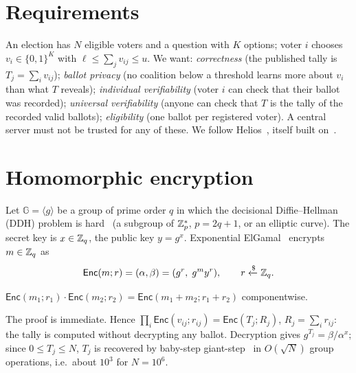 \documentclass[10pt,twocolumn]{article}
\newcommand{\G}{\mathbb{G}}
\newcommand{\Enc}{\mathsf{Enc}}
\begin{document}
\maketitle

\begin{abstract}
\noindent In the 2022 French legislative elections, more than $77\%$ of voters abroad voted online, but could not verify that their ballot was counted. We describe a Helios-type protocol in which (i) ballots are encrypted with additively homomorphic exponential ElGamal, so that the tally is computed on ciphertexts; (ii) each ballot carries non-interactive zero-knowledge proofs of validity; (iii) the decryption key is shared among trustees; (iv) every voter can check that their ballot is on a public bulletin board, and anyone can recompute the result. We state the security reductions, the soundness and zero-knowledge of the proofs, and a cost analysis showing that elections with $10^6$ voters are verifiable on commodity hardware, with none of the energy cost of a public blockchain.
\end{abstract}

\section{Requirements}
An election has $N$ eligible voters and a question with $K$ options; voter $i$ chooses $v_i\in\{0,1\}^K$ with $\ell\le\sum_jv_{ij}\le u$. We want: \emph{correctness} (the published tally is $T_j=\sum_iv_{ij}$); \emph{ballot privacy} (no coalition below a threshold learns more about $v_i$ than what $T$ reveals); \emph{individual verifiability} (voter $i$ can check that their ballot was recorded); \emph{universal verifiability} (anyone can check that $T$ is the tally of the recorded valid ballots); \emph{eligibility} (one ballot per registered voter). A central server must not be trusted for any of these. We follow Helios~\cite{helios2008}, itself built on~\cite{cgs1997}.

\section{Homomorphic encryption}
Let $\G=\langle g\rangle$ be a group of prime order $q$ in which the decisional Diffie--Hellman (DDH) problem is hard~\cite{boneh1998} (a subgroup of $\mathbb{Z}_p^*$, $p=2q+1$, or an elliptic curve). The secret key is $x\in\mathbb{Z}_q$, the public key $y=g^x$. Exponential ElGamal~\cite{elgamal1985} encrypts $m\in\mathbb{Z}_q$ as
\begin{equation}
\Enc(m;r)=(\alpha,\beta)=(g^r,\;g^my^r),\qquad r\xleftarrow{\$}\Z_q .
\end{equation}
\begin{proposition}[homomorphism]
$\Enc(m_1;r_1)\cdot\Enc(m_2;r_2)=\Enc(m_1+m_2;r_1+r_2)$ componentwise.
\end{proposition}
\noindent The proof is immediate. Hence $\prod_i\Enc(v_{ij};r_{ij})=\Enc(T_j;R_j)$, $R_j=\sum_ir_{ij}$: the tally is computed without decrypting any ballot. Decryption gives $g^{T_j}=\beta/\alpha^x$; since $0\le T_j\le N$, $T_j$ is recovered by baby-step giant-step~\cite{shanks1971} in $O(\sqrt N)$ group operations, i.e.\ about $10^3$ for $N=10^6$.
\end{document}
